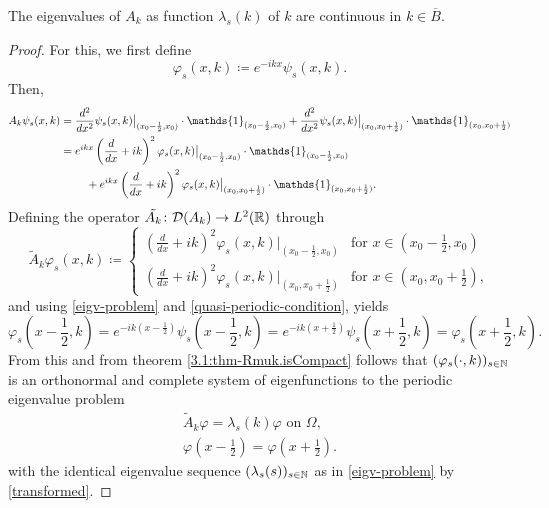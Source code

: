 \begin{theorem}
	The eigenvalues of $A_{k}$ as function $\lambda_{s}(k)$ of $k$ are continuous in $k \in \overline{B}$.

	\begin{proof}
		For this, we first define
			\[ \varphi_{s}(x, k) \coloneqq e^{-ikx} \psi_{s}(x, k). \]
		Then,
		\begin{align}
			A_{k} \psi_{s}(x, k) & = \frac{d^{2}}{dx^{2}} \psi_{s}(x, k)\big|_{(x_{0} - \frac{1}{2}, x_{0})} \cdot \mathds{1}_{(x_{0} - \frac{1}{2}, x_{0})} + \frac{d^{2}}{dx^{2}} \psi_{s}(x, k)\big|_{(x_{0}, x_{0}  + \frac{1}{2})} \cdot \mathds{1}_{(x_{0}, x_{0} + \frac{1}{2})} \notag \\
				& = e^{ikx} \left( \frac{d}{dx} + ik \right)^{2} \varphi_{s}(x, k)\big|_{(x_{0} - \frac{1}{2}, x_{0})} \cdot \mathds{1}_{(x_{0} - \frac{1}{2}, x_{0})} \notag \\
				& ~\qquad + e^{ikx} \left( \frac{d}{dx} + ik \right)^{2} \varphi_{s}(x, k)\big|_{(x_{0}, x_{0}  + \frac{1}{2})} \cdot \mathds{1}_{(x_{0}, x_{0} + \frac{1}{2})}. \label{transformed}
		\end{align}
		Defining the operator $\tilde{A_{k}} \colon \mathcal{D}(A_{k}) \rightarrow L^{2}(\mathbb{R})$ through 
			\[ \tilde{A}_{k} \varphi_{s}(x, k) \coloneqq \begin{cases}
 				\left( \frac{d}{dx} + ik \right)^{2} \varphi_{s}(x, k)|_{(x_{0} - \frac{1}{2}, x_{0})} & \text{for } x \in (x_{0} - \frac{1}{2}, x_{0}) \\ \left( \frac{d}{dx} + ik \right)^{2} \varphi_{s}(x, k)|_{(x_{0}, x_{0}  + \frac{1}{2})} & \text{for } x \in (x_{0}, x_{0} + \frac{1}{2}),
 			\end{cases} \] 
		and using \eqref{eigv-problem} and \eqref{quasi-periodic-condition}, yields
			\[ \varphi_{s}\left(x - \frac{1}{2}, k\right) = e^{-ik(x - \frac{1}{2})} \psi_{s}\left(x - \frac{1}{2}, k\right) = e^{-ik(x + \frac{1}{2})} \psi_{s}\left(x + \frac{1}{2}, k\right) = \varphi_{s}\left(x + \frac{1}{2}, k\right). \]
		From this and from theorem \ref{3.1:thm-Rmuk.isCompact} follows that $(\varphi_{s}(\cdot, k))_{s \in \mathbb{N}}$ is an orthonormal and complete system of eigenfunctions to the periodic eigenvalue problem
		\begin{align}
			\tilde{A}_{k} \varphi = \lambda_{s}(k) \varphi \text{ on } \Omega, \label{mod-eigv-problem} \\
		 	\varphi(x - \frac{1}{2}) = \varphi(x + \frac{1}{2}). \label{periodic-condition}
		\end{align}
		with the identical eigenvalue sequence $(\lambda_{s}(s))_{s \in \mathbb{N}}$ as in \eqref{eigv-problem} by \eqref{transformed}.
	\end{proof}
\end{theorem}